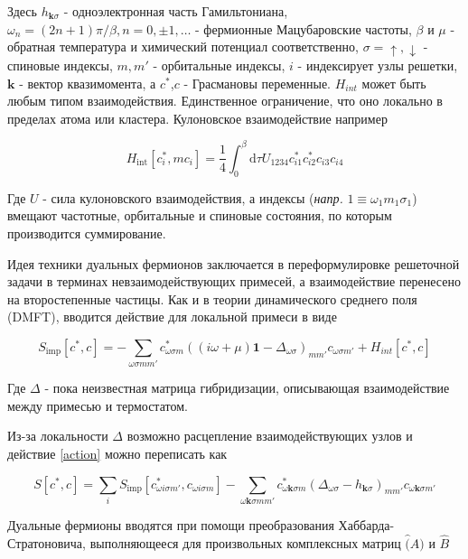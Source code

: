 \documentclass[11pt,a4paper]{report}
\begin{document}
Здесь $h_{\mathbf{k}\sigma}$ - одноэлектронная часть Гамильтониана, $\omega_n=(2n+1)\pi/\beta,n = 0,\pm 1,\dots$ - фермионные Мацубаровские частоты, 
$\beta$ и $\mu$ - обратная температура и химический потенциал соответственно, $\sigma=\uparrow,\downarrow$ - спиновые индексы,
$m,m'$ - орбитальные индексы, $i$ - индексирует узлы решетки, $\mathbf{k}$ - вектор квазимомента, а $c^*$,$c$ - Грасмановы переменные. 
$H_{int}$ может быть любым типом взаимодействия. Единственное ограничение, что оно локально в пределах атома или кластера. Кулоновское взаимодействие например

\begin{equation}
 H_{\text{int}}[c^*_i,mc_i] = \frac{1}{4} \int_0^\beta \mathrm{d}\tau U_{1234} c_{i1}^* c_{i2}^* c_{i3} c_{i4}
\end{equation}

Где $U$ - сила кулоновского взаимодействия, а индексы (\textit{напр.} $1\equiv{\omega_1 m_1\sigma_1}$) вмещают частотные, орбитальные и спиновые состояния, по которым производится суммирование.

Идея техники дуальных фермионов заключается в переформулировке решеточной задачи в терминах невзаимодействующих примесей, а взаимодействие перенесено на второстепенные частицы.
Как и в теории динамического среднего поля (DMFT), вводится действие для локальной примеси в виде

\begin{equation}
 S_{\text{imp}}[c^*,c] = - \sum_{\omega\sigma m m'}c^*_{\omega\sigma m}((i\omega+\mu)\mathbf{1}-\Delta_{\omega\sigma})_{mm'}c_{\omega\sigma m'} + H_{int}[c^*,c]
\end{equation}

Где $\Delta$ - пока неизвестная матрица гибридизации, описывающая взаимодействие между примесью и термостатом.

Из-за локальности $\Delta$ возможно расцепление взаимодействующих узлов и действие \ref{action} можно переписать как

\begin{equation}
 S[c^*,c] = \sum_i S_{\text{imp}}[c^*_{\omega i \sigma m'},c_{\omega i\sigma m}] - \sum_{\omega\mathbf{k}\sigma mm'}c^*_{\omega\mathbf{k}\sigma m}(\Delta_{\omega\sigma}-h_{\mathbf{k}\sigma})_{mm'}c_{\omega\mathbf{k}\sigma m'}
\end{equation}

Дуальные фермионы вводятся при помощи преобразования Хаббарда-Стратоновича, выполняющееся для произвольных комплексных матриц $\hat(A)$ и $\hat{B}$
\end{document}
